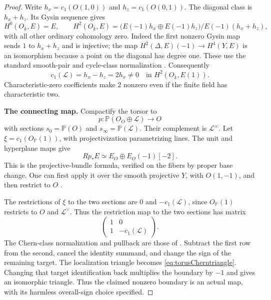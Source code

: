 \documentclass[11pt,a4paper]{article}
\renewcommand{\S}{\ensuremath{\mathsection}}
\theoremstyle{named}\newtheorem{finding}{Finding}[section]
\theoremstyle{definition}\newtheorem{definition}[finding]{Definition}
\theoremstyle{remark}\newtheorem{remark}[finding]{Remark}
\begin{document}
\begin{proof}
Write \(h_x=c_1(O(1,0))\) and \(h_z=c_1(O(0,1))\).
The diagonal class is \(h_x+h_z\). Its Gysin sequence gives
\begin{equation}\label{eq:offdiagonalcohomology}
 H^0(O_{\bar k},E)=E,\qquad
 H^2(O_{\bar k},E)
   =\bigl(E(-1)h_x\oplus E(-1)h_z\bigr)/
                         E(-1)(h_x+h_z),
\end{equation}
with all other ordinary cohomology zero.
Indeed the first nonzero Gysin map sends \(1\) to
\(h_x+h_z\) and is injective; the map
\(H^2(\Delta,E)(-1)\to H^4(Y,E)\) is an isomorphism
because a point on the diagonal has degree one.
These use the standard smooth-pair and cycle-class normalization
\cite[Theorem~16.1 and Corollary~16.2, p.~108;
\(\S23\), pp.~138--139; Remark~24.2(b), p.~145]{Milne}.
Consequently
\begin{equation}\label{eq:torusnonzeroChern}
 c_1(\mathcal L)=h_x-h_z=2h_x\ne0
                       \quad\text{in }H^2(O_{\bar k},E(1)).
\end{equation}
Characteristic-zero coefficients make \(2\) nonzero even if
the finite field has characteristic two.

\par\smallskip\noindent\textbf{The connecting map.}\quad
Compactify the torsor to
\[
 p:\mathbb P(O_O\oplus\mathcal L)\to O
\]
with sections \(s_0=\mathbb P(O)\) and
\(s_\infty=\mathbb P(\mathcal L)\).
Their complement is \(\mathcal L^\times\).
Let \(\xi=c_1(O_{\mathbb P}(1))\), with projectivization
parametrizing lines. The unit and hyperplane maps give
\[
                   Rp_*E\simeq E_O\oplus E_O(-1)[-2].
\]
This is the projective-bundle formula, verified on the fibers
by proper base change. One can first apply it over the smooth
projective \(Y\), with \(O(1,-1)\), and then restrict to \(O\)
\cite[Theorem~23.2, pp.~139--140]{Milne}.

The restrictions of \(\xi\) to the two sections are \(0\) and
\(-c_1(\mathcal L)\), since \(O_{\mathbb P}(1)\) restricts
to \(O\) and \(\mathcal L^\vee\). Thus the restriction map to
the two sections has matrix
\begin{equation}\label{eq:twoSectionChernMatrix}
                    \begin{pmatrix}
                     1&0\\
                     1&-c_1(\mathcal L)
                    \end{pmatrix}.
\end{equation}
The Chern-class normalization and pullback are those of
\cite[Theorem~23.3(a),(b), p.~140]{Milne}.
Subtract the first row from the second, cancel the identity
summand, and change the sign of the remaining target.
The localization triangle becomes
\eqref{eq:torusCherntriangle}.
Changing that target identification back multiplies the
boundary by \(-1\) and gives an isomorphic triangle.
Thus the claimed nonzero boundary is an actual map, with
its harmless overall-sign choice specified.


\end{proof}
\end{document}
